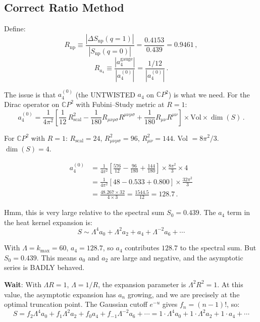 \documentclass[11pt,a4paper]{article}
\newcommand{\CP}{\mathbb{C}P}
\begin{document}
\subsection{Correct Ratio Method}

Define:
\begin{equation}
R_{\mathrm{np}} \equiv \frac{|\Delta S_{\mathrm{np}}(q=1)|}{|S_{\mathrm{np}}(q=0)|} = \frac{0.4153}{0.439} = 0.9461\,,
\end{equation}
\begin{equation}
R_{a_4} \equiv \frac{|a_4^{\mathrm{gauge}}|}{|a_4^{(0)}|} = \frac{1/12}{|a_4^{(0)}|}\,.
\end{equation}

The issue is that $a_4^{(0)}$ (the UNTWISTED $a_4$ on $\CP^2$) is what we need. For the Dirac operator on $\CP^2$ with Fubini--Study metric at $R = 1$:
\begin{equation}
a_4^{(0)} = \frac{1}{4\pi^2}\left[\frac{1}{12}\,R_{\mathrm{scal}}^2 - \frac{1}{180}R_{\mu\nu\rho\sigma}R^{\mu\nu\rho\sigma} + \frac{1}{180}R_{\mu\nu}R^{\mu\nu}\right] \times \mathrm{Vol} \times \dim(S)\,.
\end{equation}

For $\CP^2$ with $R = 1$: $R_{\mathrm{scal}} = 24$, $R_{\mu\nu\rho\sigma}^2 = 96$, $R_{\mu\nu}^2 = 144$. Vol $= 8\pi^2/3$. $\dim(S) = 4$.

\begin{align}
a_4^{(0)} &= \frac{1}{4\pi^2}\left[\frac{576}{12} - \frac{96}{180} + \frac{144}{180}\right] \times \frac{8\pi^2}{3} \times 4 \\
&= \frac{1}{4\pi^2}\left[48 - 0.533 + 0.800\right] \times \frac{32\pi^2}{3} \\
&= \frac{48.267 \times 32}{4 \times 3} = \frac{1544.5}{12} = 128.7\,.
\end{align}

Hmm, this is very large relative to the spectral sum $S_0 = 0.439$. The $a_4$ term in the heat kernel expansion is:
\begin{equation}
S \sim \Lambda^4 a_0 + \Lambda^2 a_2 + a_4 + \Lambda^{-2} a_6 + \cdots
\end{equation}

With $\Lambda = k_{\max} = 60$, $a_4 = 128.7$, so $a_4$ contributes $128.7$ to the spectral sum. But $S_0 = 0.439$. This means $a_0$ and $a_2$ are large and negative, and the asymptotic series is BADLY behaved.

\textbf{Wait}: With $\Lambda R = 1$, $\Lambda = 1/R$, the expansion parameter is $\Lambda^2 R^2 = 1$. At this value, the asymptotic expansion has $a_n$ growing, and we are precisely at the optimal truncation point. The Gaussian cutoff $e^{-u}$ gives $f_n = (n-1)!$, so:
\begin{equation}
S = f_2 \Lambda^4 a_0 + f_1 \Lambda^2 a_2 + f_0 a_4 + f_{-1}\Lambda^{-2} a_6 + \cdots = 1 \cdot \Lambda^4 a_0 + 1 \cdot \Lambda^2 a_2 + 1 \cdot a_4 + \cdots
\end{equation}
\end{document}
